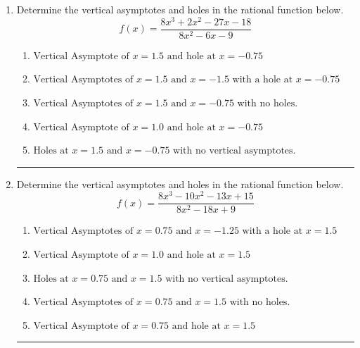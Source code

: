 \documentclass[14pt]{extbook}
\newcommand{\litem}[1]{\item#1\hspace*{-1cm}\rule{\textwidth}{0.4pt}}
\begin{document}
\begin{enumerate}
{\begin{enumerate}[label=\Alph*.]
\end{enumerate} }
\litem{
Determine the vertical asymptotes and holes in the rational function below.\[ f(x) = \frac{8x^{3} +2 x^{2} -27 x -18}{8x^{2} -6 x -9} \]\begin{enumerate}[label=\Alph*.]
\item \( \text{Vertical Asymptote of } x = 1.5 \text{ and hole at } x = -0.75 \)
\item \( \text{Vertical Asymptotes of } x = 1.5 \text{ and } x = -1.5 \text{ with a hole at } x = -0.75 \)
\item \( \text{Vertical Asymptotes of } x = 1.5 \text{ and } x = -0.75 \text{ with no holes.} \)
\item \( \text{Vertical Asymptote of } x = 1.0 \text{ and hole at } x = -0.75 \)
\item \( \text{Holes at } x = 1.5 \text{ and } x = -0.75 \text{ with no vertical asymptotes.} \)

\end{enumerate} }
\litem{
Determine the vertical asymptotes and holes in the rational function below.\[ f(x) = \frac{8x^{3} -10 x^{2} -13 x + 15}{8x^{2} -18 x + 9} \]\begin{enumerate}[label=\Alph*.]
\item \( \text{Vertical Asymptotes of } x = 0.75 \text{ and } x = -1.25 \text{ with a hole at } x = 1.5 \)
\item \( \text{Vertical Asymptote of } x = 1.0 \text{ and hole at } x = 1.5 \)
\item \( \text{Holes at } x = 0.75 \text{ and } x = 1.5 \text{ with no vertical asymptotes.} \)
\item \( \text{Vertical Asymptotes of } x = 0.75 \text{ and } x = 1.5 \text{ with no holes.} \)
\item \( \text{Vertical Asymptote of } x = 0.75 \text{ and hole at } x = 1.5 \)

\end{enumerate} }
\end{enumerate}
\end{document}
